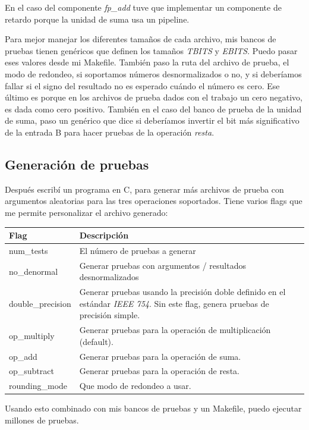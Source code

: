 \documentclass[a4paper]{article}
\begin{document}
En el caso del componente \textit{fp\_add} tuve que implementar un componente de retardo porque la unidad de suma usa un pipeline.

Para mejor manejar los diferentes tamaños de cada archivo, mis bancos de pruebas tienen genéricos que definen los tamaños \textit{TBITS} y \textit{EBITS}. Puedo pasar eses valores desde mi Makefile. También paso la ruta del archivo de prueba, el modo de redondeo, si soportamos números desnormalizados o no, y si deberíamos fallar si el signo del resultado no es esperado cuándo el número es cero. Ese último es porque en los archivos de prueba dados con el trabajo un cero negativo, es dada como cero positivo. También en el caso del banco de prueba de la unidad de suma, paso un genérico que dice si deberíamos invertir el bit más significativo de la entrada B para hacer pruebas de la operación \textit{resta}.

\subsection{Generación de pruebas}

Después escribí un programa en C, para generar más archivos de prueba con argumentos aleatorias para las tres operaciones soportados. Tiene varios flags que me permite personalizar el archivo generado:

\begin{tabular}{ | l | p{10cm} | }
\hline
Flag & Descripción \\
\hline
num\_tests & El número de pruebas a generar \\
no\_denormal & Generar pruebas con argumentos / resultados desnormalizados \\
double\_precision & Generar pruebas usando la precisión doble definido en el estándar \textit{IEEE 754}. Sin este flag, genera pruebas de precisión simple. \\
op\_multiply & Generar pruebas para la operación de multiplicación (default). \\
op\_add & Generar pruebas para la operación de suma. \\
op\_subtract & Generar pruebas para la operación de resta. \\
rounding\_mode & Que modo de redondeo a usar. \\
\hline
\end{tabular}

Usando esto combinado con mis bancos de pruebas y un Makefile, puedo ejecutar millones de pruebas.
\end{document}
